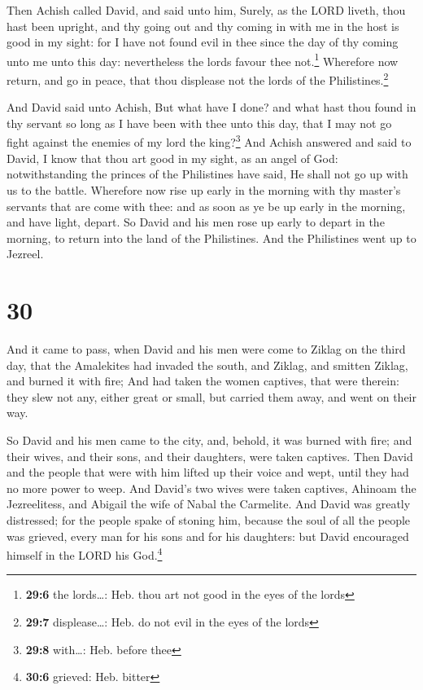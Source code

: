 Then Achish called David, and said unto him, Surely, as
the LORD liveth, thou hast been upright, and thy going out and thy
coming in with me in the host is good in my sight: for I have not found
evil in thee since the day of thy coming unto me unto this day:
nevertheless the lords favour thee not.\footnote{\textbf{29:6} the
  lords\ldots: Heb. thou art not good in the eyes of the lords}
 Wherefore now return, and go in peace, that thou
displease not the lords of the Philistines.\footnote{\textbf{29:7}
  displease\ldots: Heb. do not evil in the eyes of the lords}

 And David said unto Achish, But what have I done? and
what hast thou found in thy servant so long as I have been with thee
unto this day, that I may not go fight against the enemies of my lord
the king?\footnote{\textbf{29:8} with\ldots: Heb. before thee}
 And Achish answered and said to David, I know that thou
art good in my sight, as an angel of God: notwithstanding the princes of
the Philistines have said, He shall not go up with us to the battle.
 Wherefore now rise up early in the morning with thy
master's servants that are come with thee: and as soon as ye be up early
in the morning, and have light, depart.  So David and his
men rose up early to depart in the morning, to return into the land of
the Philistines. And the Philistines went up to Jezreel.

\hypertarget{section-29}{%
\section{30}\label{section-29}}

 And it came to pass, when David and his men were come to
Ziklag on the third day, that the Amalekites had invaded the south, and
Ziklag, and smitten Ziklag, and burned it with fire;  And
had taken the women captives, that were therein: they slew not any,
either great or small, but carried them away, and went on their way.

 So David and his men came to the city, and, behold, it
was burned with fire; and their wives, and their sons, and their
daughters, were taken captives.  Then David and the people
that were with him lifted up their voice and wept, until they had no
more power to weep.  And David's two wives were taken
captives, Ahinoam the Jezreelitess, and Abigail the wife of Nabal the
Carmelite.  And David was greatly distressed; for the
people spake of stoning him, because the soul of all the people was
grieved, every man for his sons and for his daughters: but David
encouraged himself in the LORD his God.\footnote{\textbf{30:6} grieved:
  Heb. bitter}

